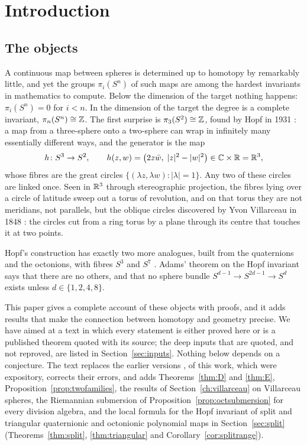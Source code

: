 \section{Introduction}\label{ch:intro}

\subsection{The objects}

A continuous map between spheres is determined up to homotopy by remarkably little, and yet the groups $\pi_i(S^n)$ of such maps are among the hardest invariants in mathematics to compute. Below the dimension of the target nothing happens: $\pi_i(S^n)=0$ for $i<n$. In the dimension of the target the degree is a complete invariant, $\pi_n(S^n)\cong\mathbb{Z}$. The first surprise is $\pi_3(S^2)\cong\mathbb{Z}$, found by Hopf in 1931 \cite{Hop31}: a map from a three-sphere onto a two-sphere can wrap in infinitely many essentially different ways, and the generator is the map
\begin{equation}\label{eq:intro-hopf}
h\colon S^3\to S^2,\qquad h(z,w)=\bigl(2z\bar w,\;|z|^2-|w|^2\bigr)\in\mathbb{C}\times\mathbb{R}=\mathbb{R}^3 ,
\end{equation}
whose fibres are the great circles $\{(\lambda z,\lambda w):|\lambda|=1\}$. Any two of these circles are linked once. Seen in $\mathbb{R}^3$ through stereographic projection, the fibres lying over a circle of latitude sweep out a torus of revolution, and on that torus they are not meridians, not parallels, but the oblique circles discovered by Yvon Villarceau in 1848 \cite{Vil48}: the circles cut from a ring torus by a plane through its centre that touches it at two points.

Hopf's construction has exactly two more analogues, built from the quaternions and the octonions, with fibres $S^3$ and $S^7$ \cite{Hop35}. Adams' theorem on the Hopf invariant \cite{Ada60} says that there are no others, and that no sphere bundle $S^{d-1}\to S^{2d-1}\to S^d$ exists unless $d\in\{1,2,4,8\}$.

This paper gives a complete account of these objects with proofs, and it adds results that make the connection between homotopy and geometry precise. We have aimed at a text in which every statement is either proved here or is a published theorem quoted with its source; the deep inputs that are quoted, and not reproved, are listed in Section~\ref{sec:inputs}. Nothing below depends on a conjecture. The text replaces the earlier versions \cite{BSS22}, \cite{Bha26a} of this work, which were expository, corrects their errors, and adds Theorems~\ref{thm:D} and \ref{thm:E}, Proposition~\ref{prop:twofamilies}, the results of Section~\ref{ch:villarceau} on Villarceau spheres, the Riemannian submersion of Proposition~\ref{prop:octsubmersion} for every division algebra, and the local formula for the Hopf invariant of split and triangular quaternionic and octonionic polynomial maps in Section~\ref{sec:split} (Theorems~\ref{thm:split}, \ref{thm:triangular} and Corollary~\ref{cor:splitrange}).

